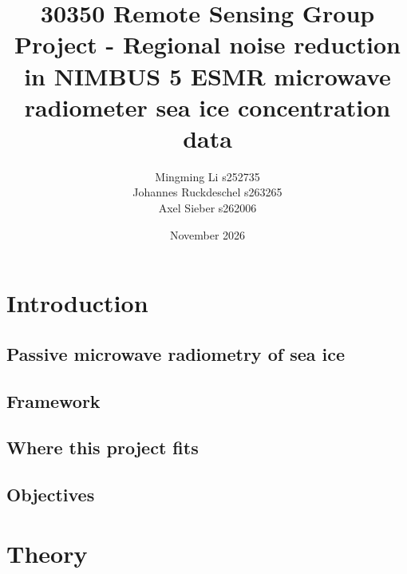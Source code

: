 \documentclass{article}
\title{30350 Remote Sensing Group Project - Regional noise reduction in NIMBUS 5 ESMR microwave radiometer sea ice concentration data}
\author{Mingming Li s252735 \\ Johannes Ruckdeschel s263265 \\ Axel Sieber s262006}
\date{November 2026}
\begin{document}
\maketitle

\begin{abstract}
\end{abstract}

\tableofcontents

\section{Introduction}

\subsection{Passive microwave radiometry of sea ice}

\subsection{Framework}

\subsection{Where this project fits}

\subsection{Objectives}

\section{Theory}
\end{document}
